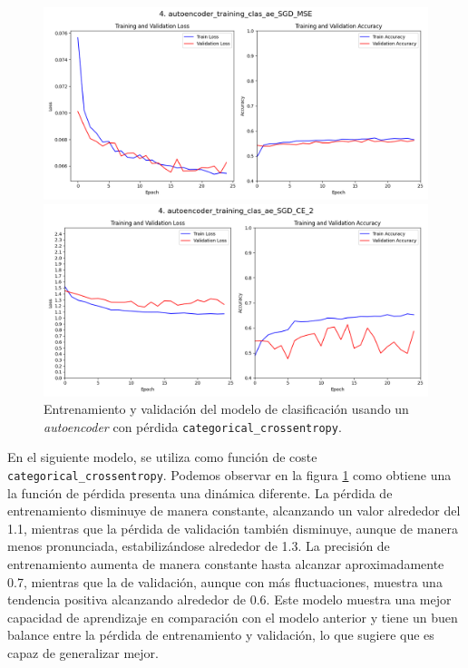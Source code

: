 \begin{figure}[h]
    \centering
    \begin{minipage}{0.45\textwidth}
        \centering
        \includegraphics[width=1.1\textwidth]{img/aeMMC_sgd_mse.png}
        \caption{Entrenamiento y validación del modelo de clasificación usando un \textit{autoencoder} con pérdida \lstinline|mse|.}
        \label{fig:ae_sgd_mse}
    \end{minipage}\hfill
    \begin{minipage}{0.45\textwidth}
        \centering
        \includegraphics[width=1.\textwidth]{img/aeMMC_sgd_ce.png}
        \caption{Entrenamiento y validación del modelo de clasificación usando un \textit{autoencoder} con pérdida \lstinline|categorical_crossentropy|.}
        \label{fig:sgd_ce}
    \end{minipage}
\end{figure}

En el siguiente modelo, se utiliza como función de coste \lstinline|categorical_crossentropy|. Podemos observar en la figura \ref{fig:sgd_ce} como obtiene una la función de pérdida presenta una dinámica diferente. La pérdida de entrenamiento disminuye de manera constante, alcanzando un valor alrededor del 1.1, mientras que la pérdida de validación también disminuye, aunque de manera menos pronunciada, estabilizándose alrededor de 1.3. La precisión de entrenamiento aumenta de manera constante hasta alcanzar aproximadamente 0.7, mientras que la de validación, aunque con más fluctuaciones, muestra una tendencia positiva alcanzando alrededor de 0.6. Este modelo muestra una mejor capacidad de aprendizaje en comparación con el modelo anterior y tiene un buen balance entre la pérdida de entrenamiento y validación, lo que sugiere que es capaz de generalizar mejor.


